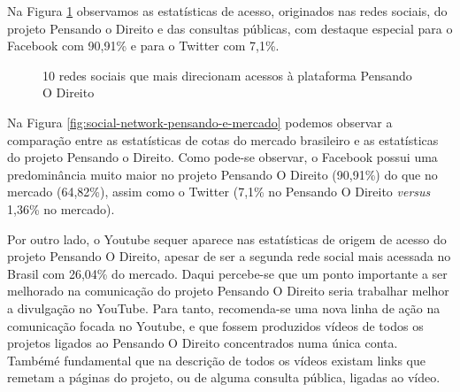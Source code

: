 Na Figura \ref{fig:social-network-pensando} observamos as estatísticas de acesso, originados nas redes sociais, do projeto Pensando o Direito e das consultas públicas, com destaque especial para o Facebook com 90,91\% e para o Twitter com 7,1\%.
\begin{figure}[htb]%
	\begin{center}
	\end{center}%
	\caption{10 redes sociais que mais direcionam acessos à plataforma Pensando O Direito\label{fig:social-network-pensando}}%
\end{figure}%

Na Figura \ref{fig:social-network-pensando-e-mercado} podemos observar a comparação entre as estatísticas de cotas do mercado brasileiro e as estatísticas do projeto Pensando o Direito. Como pode-se observar, o Facebook possui uma predominância muito maior no projeto Pensando O Direito (90,91\%) do que no mercado (64,82\%), assim como o Twitter (7,1\% no Pensando O Direito \textit{versus} 1,36\% no mercado).

Por outro lado, o Youtube sequer aparece nas estatísticas de origem de acesso do projeto Pensando O Direito, apesar de ser a segunda rede social mais acessada no Brasil com 26,04\% do mercado. Daqui percebe-se que um ponto importante a ser melhorado na comunicação do projeto Pensando O Direito seria trabalhar melhor a divulgação no YouTube. Para tanto, recomenda-se uma nova linha de ação na comunicação focada no Youtube, e que fossem produzidos vídeos de todos os projetos ligados ao Pensando O Direito concentrados numa única conta. Tambémé fundamental que na descrição de todos os vídeos existam links que remetam a páginas do projeto, ou de alguma consulta pública, ligadas ao vídeo.

